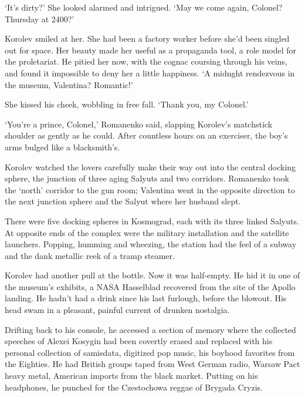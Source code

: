 ‘It’s dirty?’ She looked alarmed and intrigued. ‘May we come again, Colonel? Thursday at 2400?’

Korolev smiled at her. She had been a factory worker before she’d been singled out for space. Her beauty made her useful as a propaganda tool, a role model for the proletariat. He pitied her now, with the cognac coursing through his veins, and found it impossible to deny her a little happiness. ‘A midnght rendezvous in the museum, Valentina? Romantic!’

She kissed his cheek, wobbling in free fall. ‘Thank you, my Colonel.’

‘You’re a prince, Colonel,’ Romanenko said, slapping Korolev’s matchstick shoulder as gently as he could. After countless hours on an exerciser, the boy’s arms bulged like a blacksmith’s.

Korolev watched the lovers carefully make their way out into the central docking sphere, the junction of three aging Salyuts and two corridors. Romanenko took the ‘north’ corridor to the gun room; Valentina went in the opposite direction to the next junction sphere and the Salyut where her husband slept.

There were five docking spheres in Kosmograd, each with its three linked Salyuts. At opposite ends of the complex were the military installation and the satellite launchers. Popping, humming and wheezing, the station had the feel of a subway and the dank metallic reek of a tramp steamer.

Korolev had another pull at the bottle. Now it was half-empty. He hid it in one of the museum’s exhibits, a NASA Hasselblad recovered from the site of the Apollo landing. He hadn’t had a drink since his last furlough, before the blowout. His head swam in a pleasant, painful current of drunken nostalgia.

Drifting back to his console, he accessed a section of memory where the collected speeches of Alexei Kosygin had been covertly erased and replaced with his personal collection of samisdata, digitized pop music, his boyhood favorites from the Eighties. He had British groups taped from West German radio, Warsaw Pact heavy metal, American imports from the black market. Putting on his headphones, he punched for the Czestochowa reggae of Brygada Cryzis.


